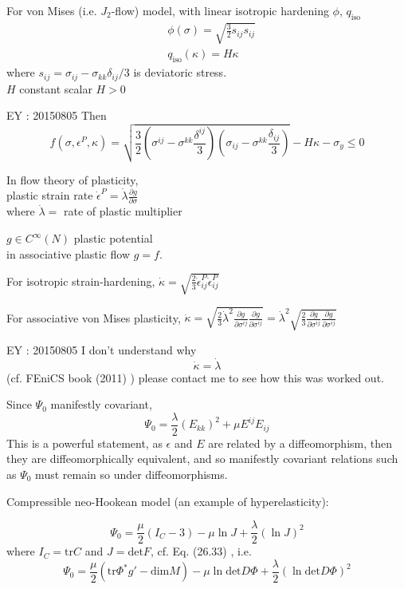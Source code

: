 \documentclass[twoside,landscape,10pt]{amsart}
\theoremstyle{plain}
\theoremstyle{definition}
\theoremstyle{remark}
\begin{document}
\begin{multicols*}{2}
For von Mises (i.e. $J_2$-flow) model, with linear isotropic hardening $\phi$, $q_{\text{iso}}$ 
\[
\begin{aligned}
  & \phi(\sigma) = \sqrt{ \frac{3}{2} s_{ij} s_{ij} } \\  
  & q_{\text{iso}}(\kappa) = H\kappa
\end{aligned}
\]
where $s_{ij} = \sigma_{ij} - \sigma_{kk} \delta_{ij}/3$ is deviatoric stress.  \\
\phantom{where } $H$ constant scalar $H >0$

EY : 20150805 Then 
\[
f(\sigma, \epsilon^P,\kappa ) = \sqrt{ \frac{3}{2} ( \sigma^{ij} - \sigma^{kk} \frac{ \delta^{ij}}{3} )( \sigma_{ij} - \sigma^{kk} \frac{ \delta_{ij} }{3} ) } - H\kappa - \sigma_y \leq 0 
\]

In flow theory of plasticity, \\
\phantom{In} plastic strain rate $\dot{\epsilon}^P = \dot{\lambda} \frac{ \partial g}{ \partial \sigma}$ \\
\phantom{In } where $\dot{\lambda} = $ rate of plastic multiplier 

$g\in C^{\infty}(N)$ plastic potential \\
in associative plastic flow $g=f$.  

For isotropic strain-hardening, $\dot{\kappa} = \sqrt{ \frac{2}{3} \dot{\epsilon}^P_{ij} \dot{\epsilon}^P_{ij} }$  

For associative von Mises plasticity, $\dot{\kappa} = \sqrt{ \frac{2}{3} \dot{\lambda}^2 \frac{ \partial g}{ \partial \sigma^{ij}} \frac{ \partial g}{ \partial \sigma^{ij} } } = \dot{\lambda}^2 \sqrt{ \frac{2}{3} \frac{ \partial g}{ \partial \sigma^{ij}} \frac{ \partial g}{ \partial \sigma^{ij}}}$

EY : 20150805 I don't understand why 
\[
\dot{\kappa} = \dot{\lambda}
\]
(cf. FEniCS book (2011) \cite{FEniCS}) please contact me to see how this was worked out.  

\hrulefill



Since $\Psi_0$ manifestly covariant,
\[
\Psi_0 = \frac{\lambda}{2} (E_{kk})^2 + \mu E^{ij} E_{ij}
\]
This is a powerful statement, as $\epsilon$ and $E$ are related by a diffeomorphism, then they are diffeomorphically equivalent, and so manifestly covariant relations such as $\Psi_0$ must remain so under diffeomorphisms.

Compressible neo-Hookean model (an example of hyperelasticity):

\begin{equation}
  \Psi_0 = \frac{\mu}{2} ( I_C - 3) - \mu \ln{J} + \frac{\lambda}{2} (\ln{J})^2
\end{equation}
where $I_C = \text{tr}C$ and $J = \text{det}F$, cf. Eq. (26.33) \cite{FEniCS}, i.e. 
\[
\Psi_0 = \frac{\mu}{2} ( \text{tr}\Phi^*g' - \text{dim}M) - \mu \ln{ \text{det}D\Phi} + \frac{\lambda}{2} (\ln{\text{det}D\Phi})^2
\]


\end{multicols*}
\end{document}
